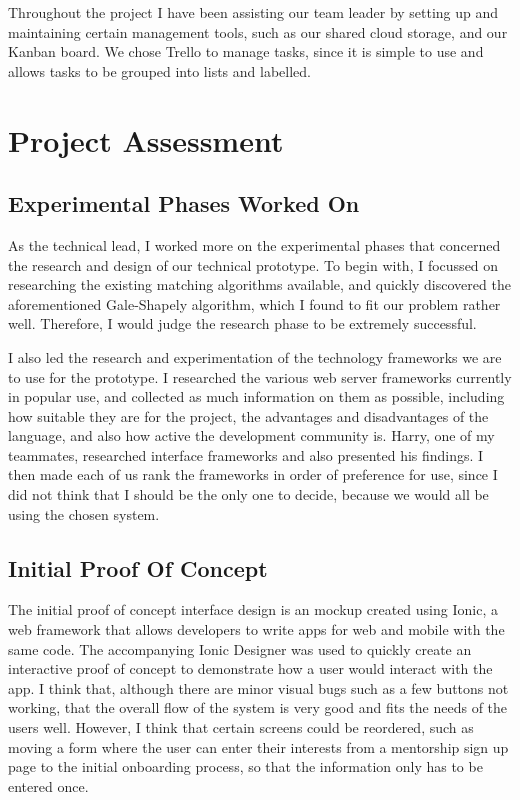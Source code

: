 \documentclass[14pt]{report}
\begin{document}
    Throughout the project I have been assisting our team leader by setting up and maintaining certain management tools, such as our shared cloud storage, and our Kanban board. We chose Trello to manage tasks, since it is simple to use and allows tasks to be grouped into lists and labelled.

    \newpage

    \section*{Project Assessment}
    \subsection*{Experimental Phases Worked On}
    As the technical lead, I worked more on the experimental phases that concerned the research and design of our technical prototype. To begin with, I focussed on researching the existing matching algorithms available, and quickly discovered the aforementioned Gale-Shapely algorithm, which I found to fit our problem rather well. Therefore, I would judge the research phase to be extremely successful.

    I also led the research and experimentation of the technology frameworks we are to use for the prototype. I researched the various web server frameworks currently in popular use, and collected as much information on them as possible, including how suitable they are for the project, the advantages and disadvantages of the language, and also how active the development community is. Harry, one of my teammates, researched interface frameworks and also presented his findings. I then made each of us rank the frameworks in order of preference for use, since I did not think that I should be the only one to decide, because we would all be using the chosen system.

    \subsection*{Initial Proof Of Concept}
    The initial proof of concept interface design is an mockup created using Ionic, a web framework that allows developers to write apps for web and mobile with the same code. The accompanying Ionic Designer was used to quickly create an interactive proof of concept to demonstrate how a user would interact with the app. I think that, although there are minor visual bugs such as a few buttons not working, that the overall flow of the system is very good and fits the needs of the users well. However, I think that certain screens could be reordered, such as moving a form where the user can enter their interests from a mentorship sign up page to the initial onboarding process, so that the information only has to be entered once.
\end{document}

